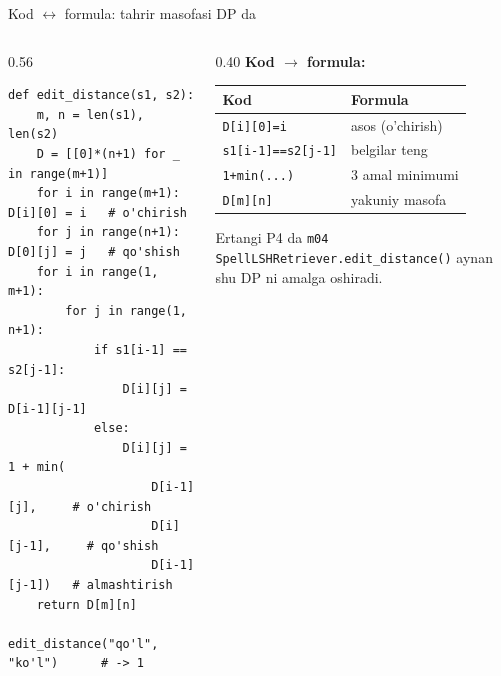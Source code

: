 \documentclass[aspectratio=169,11pt]{beamer}
\begin{document}
\begin{frame}[fragile]{Kod $\leftrightarrow$ formula: tahrir masofasi DP da}
  \begin{columns}[T]
    \begin{column}{0.56\textwidth}
\begin{lstlisting}
def edit_distance(s1, s2):
    m, n = len(s1), len(s2)
    D = [[0]*(n+1) for _ in range(m+1)]
    for i in range(m+1): D[i][0] = i   # o'chirish
    for j in range(n+1): D[0][j] = j   # qo'shish
    for i in range(1, m+1):
        for j in range(1, n+1):
            if s1[i-1] == s2[j-1]:
                D[i][j] = D[i-1][j-1]
            else:
                D[i][j] = 1 + min(
                    D[i-1][j],     # o'chirish
                    D[i][j-1],     # qo'shish
                    D[i-1][j-1])   # almashtirish
    return D[m][n]

edit_distance("qo'l", "ko'l")      # -> 1
\end{lstlisting}
    \end{column}
    \begin{column}{0.40\textwidth}
      \textbf{Kod $\to$ formula:}\\[3pt]
      \footnotesize
      \begin{tabular}{p{1.9cm}p{2.1cm}}
        \toprule
        Kod & Formula \\
        \midrule
        \texttt{D[i][0]=i} & asos (o'chirish) \\
        \texttt{s1[i-1]==s2[j-1]} & belgilar teng \\
        \texttt{1+min(...)} & 3 amal minimumi \\
        \texttt{D[m][n]} & yakuniy masofa \\
        \bottomrule
      \end{tabular}
      \vspace{4pt}
      \begin{tcolorbox}[okbox,top=2pt,bottom=2pt]
        \footnotesize
        Ertangi P4 da \texttt{m04 SpellLSHRetriever.edit\_distance()}
        aynan shu DP ni amalga oshiradi.
      \end{tcolorbox}
    \end{column}
  \end{columns}
\end{frame}
\end{document}
